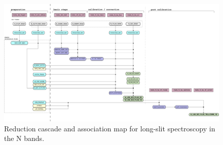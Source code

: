 \begin{figure}
  \centering
  \includegraphics[width=0.9\textheight]{figures/N_LSS_pipeline_wf_draft_latest_v0.72.png}
  \caption[Reduction cascade and association map for N long-slit
  spectroscopy]{Reduction cascade and association map for long-slit
    spectroscopy in the N bands.  }
  \label{Fig:NLssAssomap}
\end{figure}

